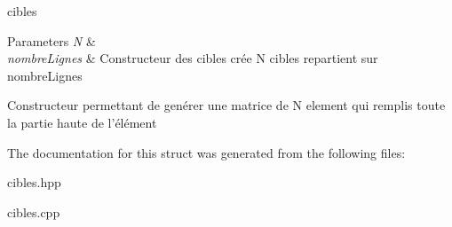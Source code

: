 cibles 


\begin{DoxyParams}{Parameters}
{\em N} & \\
\hline
{\em nombre\-Lignes} & Constructeur des cibles crée N cibles repartient sur nombre\-Lignes\\
\hline
\end{DoxyParams}
Constructeur permettant de genérer une matrice de N element qui remplis toute la partie haute de l'élément 

The documentation for this struct was generated from the following files\-:\begin{DoxyCompactItemize}
\item 
cibles.\-hpp\item 
cibles.\-cpp\end{DoxyCompactItemize}
